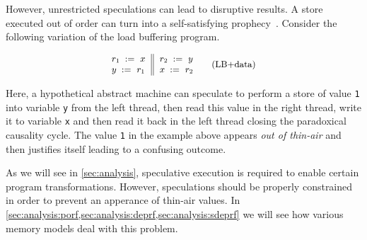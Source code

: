 However, unrestricted speculations can lead to disruptive results. 
A store executed out of order can turn into 
a self-satisfying prophecy~\cite{Boehm-Demsky:MSPC14}.
Consider the following variation of the load buffering program. 

\begin{equation*}
\small
\inarrII{
  \readInst{}{r_1}{x}   \\
  \writeInst{}{y}{r_1}  \\
}{
  \readInst{}{r_2}{y}   \\
  \writeInst{}{x}{r_2}  \\
}
\tag{LB+data}\label{ex:lb+data}
\end{equation*}

Here, a hypothetical abstract machine can speculate 
to perform a store of value \texttt{1} into variable \texttt{y}
from the left thread, then read this value in the right thread, 
write it to variable \texttt{x} and then read it back in the
left thread closing the paradoxical causality cycle.
The value \texttt{1} in the example above appears \emph{out of thin-air}
and then justifies itself leading to a confusing outcome.

As we will see in \cref{sec:analysis}, speculative execution 
is required to enable certain program transformations. 
However, speculations should be properly constrained
in order to prevent an apperance of thin-air values. 
In \cref{sec:analysis:porf,sec:analysis:deprf,sec:analysis:sdeprf}
we will see how various memory models deal with this problem. 
